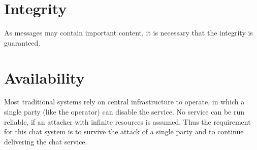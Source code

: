 % 
\section{Integrity}
As messages may contain important content, it is necessary that the integrity
is guaranteed.
\section{Availability}
Most traditional systems rely on central infrastructure to operate, in which a
single party (like the operator) can disable the service. 
No service can be run reliable, if an attacker with infinite resources is assumed.
Thus the requirement for this chat system is to survive the attack of a single
party and to continue delivering the chat service.
